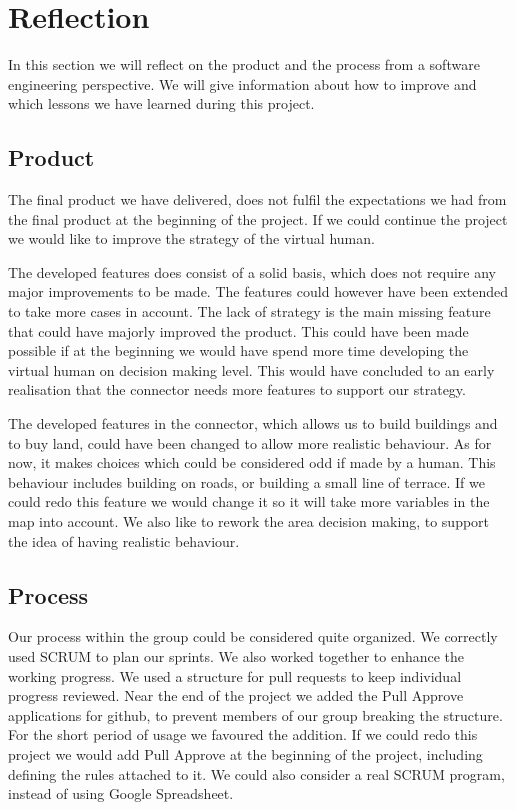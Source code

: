 \section{Reflection}
In this section we will reflect on the product and the process from a software engineering perspective. We will give information about how to improve and which lessons we have learned during this project.
\subsection{Product}
The final product we have delivered, does not fulfil the expectations we had from the final product at the beginning of the project. If we could continue the project we would like to improve the strategy of the virtual human.

The developed features does consist of a solid basis, which does not require any major improvements to be made. The features could however have been extended to take more cases in account. The lack of strategy is the main missing feature that could have majorly improved the product. This could have been made possible if at the beginning we would have spend more time developing the virtual human on decision making level. This would have concluded to an early realisation that the connector needs more features to support our strategy.

The developed features in the connector, which allows us to build buildings and to buy land, could have been changed to allow more realistic behaviour. As for now, it makes choices which could be considered odd if made by a human. This behaviour includes building on roads, or building a small line of terrace. If we could redo this feature we would change it so it will take more variables in the map into account. We also like to rework the area decision making, to support the idea of having realistic behaviour.

\subsection{Process}
Our process within the group could be considered quite organized. We correctly used SCRUM to plan our sprints. We also worked together to enhance the working progress. We used a structure for pull requests to keep individual progress reviewed. Near the end of the project we added the Pull Approve applications for github, to prevent members of our group breaking the structure. For the short period of usage we favoured the addition. If we could redo this project we would add Pull Approve at the beginning of the project, including defining the rules attached to it. We could also consider a real SCRUM program, instead of using Google Spreadsheet.

